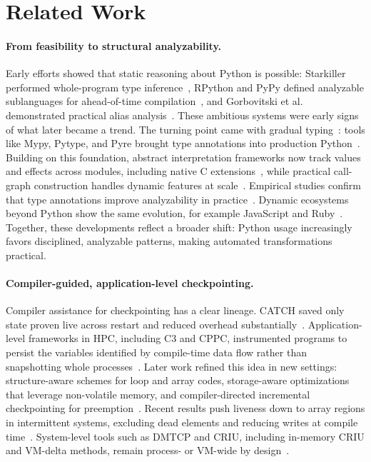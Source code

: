 \section{Related Work}
\label{sec:related}

\paragraph{From feasibility to structural analyzability.}
Early efforts showed that static reasoning about Python is possible: Starkiller performed whole-program type inference~\cite{salib2004starkiller}, RPython and PyPy defined analyzable sublanguages for ahead-of-time compilation~\cite{ancona2007rpython}, and Gorbovitski et al. demonstrated practical alias analysis~\cite{gorbovitski2010alias}. These ambitious systems were early signs of what later became a trend. The turning point came with gradual typing~\cite{siek2007gradual,vitousek2014design}: tools like Mypy, Pytype, and Pyre brought type annotations into production Python~\cite{mypy,pytype,pyre}. Building on this foundation, abstract interpretation frameworks now track values and effects across modules, including native C extensions~\cite{fromherz2018static,monat2021static,monat2021multilanguage}, while practical call-graph construction handles dynamic features at scale~\cite{salis2021pycg,rakamnouykit2024potohybridandersenspointsto}. Empirical studies confirm that type annotations improve analyzability in practice~\cite{bence2021unambiguity}. Dynamic ecosystems beyond Python show the same evolution, for example JavaScript and Ruby~\cite{jensen2009type,furr2009static,kashyap2014jsai,kazerounian2021simtyper}. Together, these developments reflect a broader shift: Python usage increasingly favors disciplined, analyzable patterns, making automated transformations practical.

\paragraph{Compiler-guided, application-level checkpointing.}
Compiler assistance for checkpointing has a clear lineage. CATCH saved only state proven live across restart and reduced overhead substantially~\cite{li1990catch}. Application-level frameworks in HPC, including C3 and CPPC, instrumented programs to persist the variables identified by compile-time data flow rather than snapshotting whole processes~\cite{bronevetsky2004application,rodriguez2010cppc}. Later work refined this idea in new settings: structure-aware schemes for loop and array codes, storage-aware optimizations that leverage non-volatile memory, and compiler-directed incremental checkpointing for preemption~\cite{elnawawy2017efficient,kannan2013optimizing,ji2022compiler}. Recent results push liveness down to array regions in intermittent systems, excluding dead elements and reducing writes at compile time~\cite{kim2024lact}. System-level tools such as DMTCP and CRIU, including in-memory CRIU and VM-delta methods, remain process- or VM-wide by design~\cite{AnselAryaCooperman2009DMTCP,CRIUProject,venkatesh2019fast,MoshikSOCC22}.

